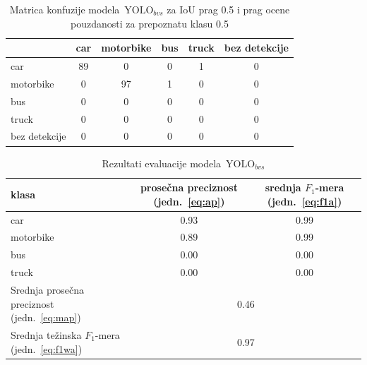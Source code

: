 \documentclass[12pt,oneside]{memoir}
\newcommand{\yolo}{\ensuremath{\,\textrm{YOLO}}}
\begin{document}
\begin{table}[htb]
    \begin{center}
    \caption{Matrica konfuzije modela $\yolo_{bvs}$ za IoU prag 0.5 i prag ocene pouzdanosti za prepoznatu klasu 0.5 }
    \begin{tabular}{ l|c|c|c|c|c|}
                  & car  & motorbike & bus & truck & bez detekcije \\ \hline
    car           & 89   & 0         & 0   & 1     & 0             \\ 
    motorbike     & 0    & 97        & 1   & 0     & 0             \\ 
    bus           & 0    & 0         & 0   & 0     & 0             \\ 
    truck         & 0    & 0         & 0   & 0     & 0             \\ 
    bez detekcije & 0    & 0         & 0   & 0     & 0             \\ \hline
    \end{tabular}
    \label{tab:YOLO4_BVS_confusion_matrix}
    \end{center}
\end{table}


\begin{table}[htb]
    \begin{center}
    \caption{Rezultati evaluacije modela $\yolo_{bvs}$}
        \begin{tabular}{|m{10em}|c|c|}
        \toprule
        klasa     & prosečna preciznost (jedn.~\ref{eq:ap}) & srednja $F_1$-mera (jedn.~\ref{eq:f1a})  \\ \hline
        \midrule
        car       & 0.93  & 0.99 \\ \hline
        motorbike & 0.89  & 0.99 \\ \hline
        bus       & 0.00  & 0.00 \\ \hline
        truck     & 0.00  & 0.00 \\ \hline
        \bottomrule
        Srednja prosečna preciznost (jedn.~\ref{eq:map}) & \multicolumn{2}{c|}{0.46}  \\ \hline
        Srednja težinska $F_1$-mera (jedn.~\ref{eq:f1wa}) & \multicolumn{2}{c|}{0.97}  \\ \hline
    \end{tabular}
    \label{tab:YOLO4_BVS_results}
    \end{center}
\end{table}
\end{document}
